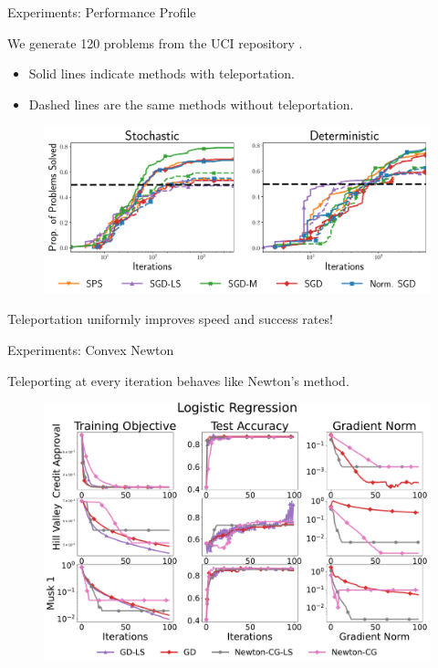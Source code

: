 \documentclass[usenames,dvipsnames,mathserif,notheorems]{beamer}
\newcommand{\bad}[1]{\textcolor{bad}{#1}}
\newcommand{\good}[1]{\textcolor{good}{#1}}
\begin{document}
\begin{frame}{Experiments: Performance Profile}

    We generate 120 problems from the UCI repository \citep{asuncion2007uci}.
    \begin{itemize}
        \pause
        \item Solid lines indicate methods \good{with teleportation}.
              \pause
        \item Dashed lines are the same methods \bad{without teleportation}.
    \end{itemize}
    \pause

    \begin{figure}
        \centering
        \includegraphics[width=1.0\textwidth]{assets/network_profile.pdf}
    \end{figure}

    \pause

    Teleportation \good{uniformly improves} speed and success rates!
\end{frame}

\begin{frame}{Experiments: Convex Newton}

    Teleporting at every iteration behaves like \bad{Newton's method}.

    \pause

    \begin{figure}
        \centering
        \includegraphics[width=1.0\textwidth]{assets/newton_comparison_logreg.pdf}
    \end{figure}

\end{frame}
\end{document}
